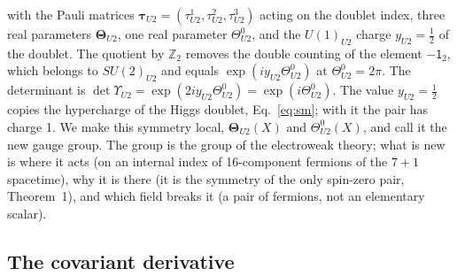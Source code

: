 with the Pauli matrices $\boldsymbol\tau_{U2}=(\tau^1_{U2},\tau^2_{U2},\tau^3_{U2})$ acting on the
doublet index, three real parameters $\boldsymbol\Theta_{U2}$, one real parameter
$\Theta^0_{U2}$, and the $U(1)_{U2}$ charge $y_{U2}=\tfrac12$ of the doublet. The quotient by
$\mathbb Z_2$ removes the double counting of the element $-\mathsf 1_2$, which belongs to
$SU(2)_{U2}$ and equals $\exp(iy_{U2}\Theta^0_{U2})$ at $\Theta^0_{U2}=2\pi$. The determinant is
$\det\Upsilon_{U2}=\exp(2iy_{U2}\Theta^0_{U2})=\exp(i\Theta^0_{U2})$. The value $y_{U2}=\tfrac12$
copies the hypercharge of the Higgs doublet, Eq.~\eqref{eq:sm}; with it the pair has charge 1.
We make this symmetry local, $\boldsymbol\Theta_{U2}(X)$ and $\Theta^0_{U2}(X)$, and call it the
new gauge group. The group is the group of the electroweak theory; what is new is where it acts
(on an internal index of 16-component fermions of the $7+1$ spacetime), why it is there (it is
the symmetry of the only spin-zero pair, Theorem~1), and which field breaks it (a pair of
fermions, not an elementary scalar).

\subsection{The covariant derivative}

